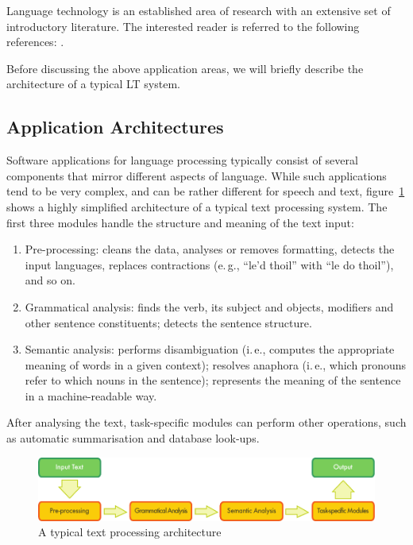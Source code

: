 \begin{multicols}{2}
Language technology is an established area of research with an extensive set of introductory literature. The interested reader is referred to the following references: \cite{carstensen-etal1, jurafsky-martin01, manning-schuetze1, lt-world1, lt-survey1}. 

Before discussing the above application areas, we will briefly describe the architecture of a typical LT system.

\subsection{Application Architectures}

Software applications for language processing typically consist of several components that mirror different aspects of language. While such applications tend to be very complex, and can be rather different for speech and text, figure~\ref{fig:textprocessingarch_en} shows a highly simplified architecture of a typical text processing system. The first three modules handle the structure and meaning of the text input:

\begin{enumerate}
\item Pre-processing: cleans the data, analyses or removes formatting, detects the input languages, replaces contractions (e.\,g., ``le’d thoil'' with ``le do thoil''), and so on.
\item Grammatical analysis: finds the verb, its subject and objects, modifiers and other sentence constituents; detects the sentence structure.
\item Semantic analysis: performs disambiguation (i.\,e., computes the appropriate meaning of words in a given context); resolves anaphora (i.\,e., which pronouns refer to which nouns in the sentence); represents the meaning of the sentence in a machine-readable way.
\end{enumerate}

After analysing the text, task-specific modules can perform other operations, such as automatic summarisation and database look-ups.

\begin{figure}[htb]
  \center
  \includegraphics[width=\textwidth]{../_media/english/text_processing_app_architecture}
  \caption{A typical text processing architecture}
\label{fig:textprocessingarch_en}
\end{figure}


\end{multicols}
